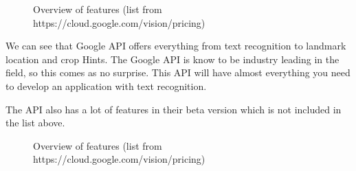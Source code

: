 \begin{figure}[h]
    \caption{Overview of features (list from https://cloud.google.com/vision/pricing)}
    \label{fig:Features}
\end{figure}

We can see that Google API offers everything from text recognition to landmark location and crop Hints.
The Google API is know to be industry leading in the field, so this comes as no surprise.
This API will have almost everything you need to develop an application with text recognition.

The API also has a lot of features in their beta version which is not included in the list above.
\clearpage


\begin{figure}[h]
    \caption{Overview of features (list from https://cloud.google.com/vision/pricing)}
    \label{fig:Prices}
\end{figure}

